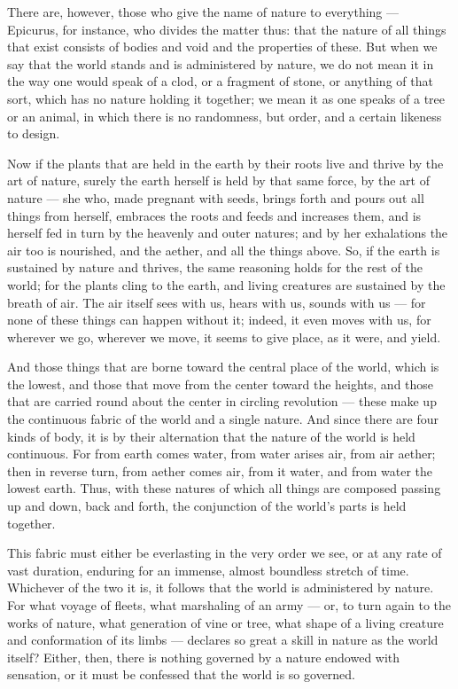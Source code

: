  There are, however, those who give the name of nature to everything — Epicurus, for instance, who divides the matter thus: that the nature of all things that exist consists of bodies and void and the properties of these. But when we say that the world stands and is administered by nature, we do not mean it in the way one would speak of a clod, or a fragment of stone, or anything of that sort, which has no nature holding it together; we mean it as one speaks of a tree or an animal, in which there is no randomness, but order, and a certain likeness to design.

 Now if the plants that are held in the earth by their roots live and thrive by the art of nature, surely the earth herself is held by that same force, by the art of nature — she who, made pregnant with seeds, brings forth and pours out all things from herself, embraces the roots and feeds and increases them, and is herself fed in turn by the heavenly and outer natures; and by her exhalations the air too is nourished, and the aether, and all the things above. So, if the earth is sustained by nature and thrives, the same reasoning holds for the rest of the world; for the plants cling to the earth, and living creatures are sustained by the breath of air. The air itself sees with us, hears with us, sounds with us — for none of these things can happen without it; indeed, it even moves with us, for wherever we go, wherever we move, it seems to give place, as it were, and yield.

 And those things that are borne toward the central place of the world, which is the lowest, and those that move from the center toward the heights, and those that are carried round about the center in circling revolution — these make up the continuous fabric of the world and a single nature. And since there are four kinds of body, it is by their alternation that the nature of the world is held continuous. For from earth comes water, from water arises air, from air aether; then in reverse turn, from aether comes air, from it water, and from water the lowest earth. Thus, with these natures of which all things are composed passing up and down, back and forth, the conjunction of the world's parts is held together.

 This fabric must either be everlasting in the very order we see, or at any rate of vast duration, enduring for an immense, almost boundless stretch of time. Whichever of the two it is, it follows that the world is administered by nature. For what voyage of fleets, what marshaling of an army — or, to turn again to the works of nature, what generation of vine or tree, what shape of a living creature and conformation of its limbs — declares so great a skill in nature as the world itself? Either, then, there is nothing governed by a nature endowed with sensation, or it must be confessed that the world is so governed.

